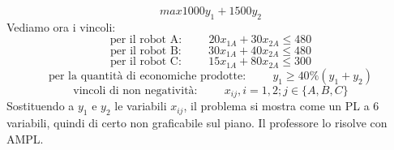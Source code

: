 \begin{equation*}
    max 1000y_1 + 1500y_2
\end{equation*}
Vediamo ora i vincoli:
\begin{equation*}
    \text{per il robot A:} \hspace{1cm} 20x_{1A} + 30x_{2A} \leq 480
\end{equation*}
\begin{equation*}
    \text{per il robot B:} \hspace{1cm} 30x_{1A} + 40x_{2A} \leq 480
\end{equation*}
\begin{equation*}
    \text{per il robot C:} \hspace{1cm} 15x_{1A} + 80x_{2A} \leq 300
\end{equation*}
\begin{equation*}
    \text{per la quantità di economiche prodotte:} \hspace{1cm} y_1 \geq 40\%(y_1+y_2)
\end{equation*}
\begin{equation*}
    \text{vincoli di non negatività:} \hspace{1cm} x_{ij}, i = 1,2; j \in \{A,B,C\}
\end{equation*}
Sostituendo a $y_1$ e $y_2$ le variabili $x_{ij}$, il problema si mostra come un PL a 6 variabili, quindi di certo non graficabile sul piano. Il professore lo risolve con AMPL.


\newpage


